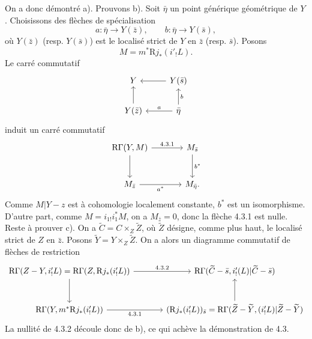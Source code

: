 \documentclass[11pt]{article}
\newcommand{\R}{\mathrm{R}}\newcommand{\RHomCore}{\mathrm{RHom}}
\providecommand{\R}{\mathrm R}
\begin{document}
On a donc démontré a). Prouvons b). Soit $\bar\eta$ un point générique géométrique de $Y$. Choisissons des flèches de spécialisation
\[
a:\bar\eta\to Y(\bar z),\qquad b:\bar\eta\to Y(\bar s),
\]
où $Y(\bar z)$ (resp. $Y(\bar s)$) est le localisé strict de $Y$ en $\bar z$ (resp. $\bar s$). Posons
\[
M=m^*\R j_*(i'_!L).
\]
Le carré commutatif
\[
\begin{tikzcd}
Y & Y(\bar s)\arrow[l]\\
Y(\bar z)\arrow[u] & \bar\eta \arrow[l,"a"']\arrow[u,"b"']
\end{tikzcd}
\]
induit un carré commutatif
\[
\begin{tikzcd}[column sep=large,row sep=large]
\R\Gamma(Y,M) \arrow[r,"4.3.1"] \arrow[d] & M_{\bar s} \arrow[d,"b^*"]\\
M_{\bar z} \arrow[r,"a^*"'] & M_{\bar\eta}.
\end{tikzcd}
\]
Comme $M|Y-z$ est à cohomologie localement constante, $b^*$ est un isomorphisme. D'autre part, comme $M=i_{1!}i_1^*M$, on a $M_{\bar z}=0$, donc la flèche 4.3.1 est nulle. Reste à prouver c). On a $\widetilde C=C\times_Z\widetilde Z$, où $\widetilde Z$ désigne, comme plus haut, le localisé strict de $Z$ en $\bar z$. Posons $\widetilde Y=Y\times_Z\widetilde Z$. On a alors un diagramme commutatif de flèches de restriction
\[
\begin{tikzcd}[column sep=large,row sep=large]
\R\Gamma(Z-Y,i'_!L)=\R\Gamma(Z,\R j_*(i'_!L))
 \arrow[r,"4.3.2"] \arrow[d]
&
\R\Gamma(\widetilde C-\bar s,i'_!(L)|\widetilde C-\bar s)\\
\R\Gamma(Y,m^*\R j_*(i'_!L)) \arrow[r,"4.3.1"']
&
(\R j_*(i'_!L))_{\bar s}
  =\R\Gamma(\widetilde Z-\widetilde Y,(i'_!L)|\widetilde Z-\widetilde Y) \arrow[u]
\end{tikzcd}
\]
La nullité de 4.3.2 découle donc de b), ce qui achève la démonstration de 4.3.
\end{document}
